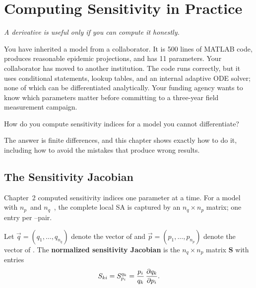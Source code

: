 \chapter{Computing Sensitivity in Practice}

\begin{flushright}
\textit{A derivative is useful only if you can compute it honestly.}
\end{flushright}

\bigskip

You have inherited a model from a collaborator.
It is 500 lines of MATLAB code, produces reasonable epidemic
projections, and has 11 parameters.
Your collaborator has moved to another institution.
The code runs correctly, but it uses conditional statements,
lookup tables, and an internal adaptive ODE solver;
none of which can be differentiated analytically.
Your funding agency wants to know which parameters matter
before committing to a three-year field measurement campaign.

How do you compute sensitivity indices for a model you cannot
differentiate?

The answer is finite differences, and this chapter shows exactly
how to do it, including how to avoid the mistakes that produce
wrong results.

\section{The Sensitivity Jacobian}
\label{sec:jacobiansec}

Chapter~2 computed sensitivity indices one parameter at a time.
For a model with $n_p$~\POIs and $n_q$~\QOIs,
the complete local SA is captured by an $n_q \times n_p$ matrix;
one entry per \POI--\QOI pair.

\begin{definition}
\label{def:SJacobian}
Let $\vec{q} = (q_1, \ldots, q_{n_q})$ denote the vector of \QOIs
and $\vec{p} = (p_1, \ldots, p_{n_p})$ denote the vector of \POIs.
The \textbf{normalized sensitivity Jacobian} is the
$n_q \times n_p$ matrix $\mathbf{S}$ with entries
\begin{equation}
  S_{ki} = S_{p_i}^{q_k} = \frac{p_i}{q_k}\,\frac{\partial q_k}{\partial p_i}.
  \label{eq:SJacobian}
\end{equation}
\end{definition}


